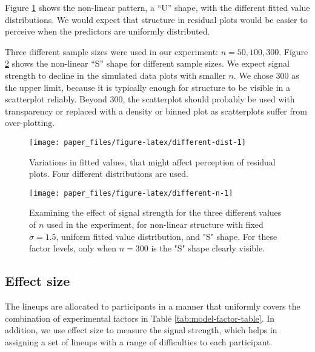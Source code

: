 \documentclass[]{interact}
\theoremstyle{plain}%
\theoremstyle{definition}
\theoremstyle{remark}
\begin{document}
Figure \ref{fig:different-dist} shows the non-linear pattern, a ``U''
shape, with the different fitted value distributions. We would expect
that structure in residual plots would be easier to perceive when the
predictors are uniformly distributed.

Three different sample sizes were used in our experiment:
\(n = 50, 100, 300\). Figure \ref{fig:different-n} shows the non-linear
``S'' shape for different sample sizes. We expect signal strength to
decline in the simulated data plots with smaller \(n\). We chose 300 as
the upper limit, because it is typically enough for structure to be
visible in a scatterplot reliably. Beyond 300, the scatterplot should
probably be used with transparency or replaced with a density or binned
plot as scatterplots suffer from over-plotting.

\begin{figure}

{\centering \texttt{[image: paper\_files/figure-latex/different-dist-1]} 

}

\caption{Variations in fitted values, that might affect perception of residual plots. Four different distributions are used.}\label{fig:different-dist}
\end{figure}

\begin{figure}

{\centering \texttt{[image: paper\_files/figure-latex/different-n-1]} 

}

\caption{Examining the effect of signal strength for the three different values of $n$ used in the experiment, for non-linear structure with fixed $\sigma = 1.5$, uniform fitted value distribution, and "S" shape. For these factor levels, only when $n = 300$ is the "S" shape clearly visible.}\label{fig:different-n}
\end{figure}

\hypertarget{effect-size}{%
\subsection{Effect size}\label{effect-size}}

The lineups are allocated to participants in a manner that uniformly
covers the combination of experimental factors in Table
\ref{tab:model-factor-table}. In addition, we use effect size to measure
the signal strength, which helps in assigning a set of lineups with a
range of difficulties to each participant.
\end{document}
